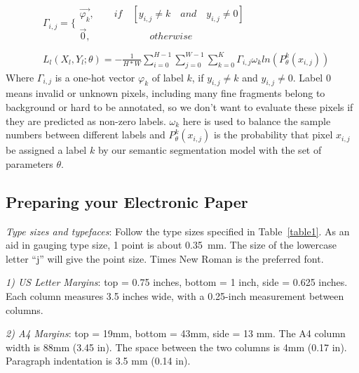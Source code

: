 \begin{equation}
\begin{split}
&\varGamma_{i,j}=\{
	\begin{array}{lr}
	\overrightarrow{\varphi_k} ,\quad\quad if \quad [y_{i,j}\neq k \quad and\quad y_{i,j}\neq0]	\\
	\overrightarrow{0} ,\quad\quad\quad\quad\quad\quad  otherwise
	\end{array}	\\
	\\
&\textit{}L_l(X_l,Y_l;\theta)=-\frac{1}{H*W}\sum_{i=0}^{H-1}\sum_{j=0}^{W-1}\sum_{k=0}^K{\varGamma_{i,j}\omega_{k}ln(P^k_{\theta}(x_{i,j}))}
\end{split}
\end{equation}
Where $\varGamma_{i,j}$ is a one-hot vector $\varphi_k$ of label $k$, if $y_{i,j}\neq k$ and $y_{i,j}\neq0$. Label 0 means invalid or unknown pixels, including many fine fragments belong to background or hard to be annotated, so we don't want to evaluate these pixels if they are predicted as non-zero labels. $\omega_{k}$ here is used to balance the sample numbers between different labels and $P^k_{\theta}(x_{i,j})$ is the probability that pixel $x_{i,j}$ be assigned a label $k$ by our semantic segmentation model with the set of parameters $\theta$.


\subsection{Preparing your Electronic Paper}

{\em Type sizes and typefaces}: Follow the type sizes specified in
Table~\ref{table1}. As an aid in gauging type size, 1 point is
about 0.35~mm. The size of the lowercase letter ``j'' will give
the point size. Times New Roman is the preferred font.

{\em 1) US Letter Margins}:  top = 0.75 inches, bottom = 1 inch, side = 0.625 inches. 
Each column measures 3.5 inches wide, with a 0.25-inch measurement between columns.

{\em 2) A4 Margins}: top = 19mm, bottom = 43mm, side = 13 mm. The A4 column width is 
88mm (3.45 in). The space between the two columns is 4mm (0.17 in). Paragraph indentation 
is 3.5 mm (0.14 in).

